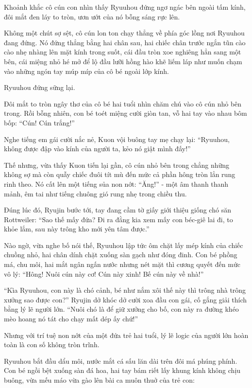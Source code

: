 \documentclass[../main.tex]{subfiles}
\begin{document}
Khoảnh khắc cô cún con nhìn thấy Ryuuhou đứng ngơ ngác bên ngoài tấm kính, đôi mắt đen láy to tròn, ươn ướt của nó bỗng sáng rực lên.

Không một chút sợ sệt, cô cún lon ton chạy thẳng về phía góc lồng nơi Ryuuhou đang đứng. Nó đứng thẳng bằng hai chân sau, hai chiếc chân trước ngắn tũn cào cào nhẹ nhàng lên mặt kính trong suốt, cái đầu tròn xoe nghiêng hẳn sang một bên, cái miệng nhỏ hé mở để lộ đầu lưỡi hồng hào khẽ liếm láp như muốn chạm vào những ngón tay múp míp của cô bé ngoài lớp kính.

Ryuuhou đứng sững lại.

Đôi mắt to tròn ngây thơ của cô bé hai tuổi nhìn chăm chú vào cô cún nhỏ bên trong. Rồi bỗng nhiên, con bé toét miệng cười giòn tan, vỗ hai tay vào nhau bôm bốp: ``Cún! Cún trắng!''

Nghe tiếng em gái cười nắc nẻ, Kuon vội buông tay mẹ chạy lại: ``Ryuuhou, không được đập vào kính của người ta, kẻo nó giật mình đấy!''

Thế nhưng, vừa thấy Kuon tiến lại gần, cô cún nhỏ bên trong chẳng những không sợ mà còn quẫy chiếc đuôi tít mù đến mức cả phần hông tròn lẳn rung rinh theo. Nó cất lên một tiếng sủa non nớt: ``Ăng!'' - một âm thanh thanh mảnh, êm tai như tiếng chuông gió rung nhẹ trong chiều thu.

Đúng lúc đó, Ryujin bước tới, tay đang cầm tờ giấy giới thiệu giống chó săn Rottweiler: ``Sao thế mấy đứa? Đi ra đằng kia xem mấy con béc-giê lai đi, to khỏe lắm, sau này trông kho mới yên tâm được.''

Nào ngờ, vừa nghe bố nói thế, Ryuuhou lập tức ôm chặt lấy mép kính của chiếc chuồng nhỏ, hai chân dính chặt xuống sàn gạch như đóng đinh. Con bé phồng má, chu môi, hai mắt ngân ngấn nước nhưng nét mặt thì cương quyết đến mức vô lý: ``Hông! Nuôi cún này cơ! Cún này xinh! Bế cún này về nhà!''

``Kìa Ryuuhou, con này là chó cảnh, bé như nắm xôi thế này thì trông nhà trông xưởng sao được con?'' Ryujin dở khóc dở cười xoa đầu con gái, cố gắng giải thích bằng lý lẽ người lớn. ``Nuôi chó là để giữ xưởng cho bố, con này ra đường khéo mèo hoang nó tát cho chạy mất dép ấy chứ!''

Nhưng với trí tuệ non nớt của một đứa trẻ hai tuổi, lý lẽ logic của người lớn hoàn toàn là con số không tròn trĩnh.

Ryuuhou bắt đầu dẩu môi, nước mắt cá sấu lăn dài trên đôi má phúng phính. Con bé ngồi bệt xuống sàn đá hoa, hai tay bám riết lấy khung kính không chịu buông, vừa mếu máo vừa gào lên bài ca muôn thuở của trẻ con:
\end{document}
